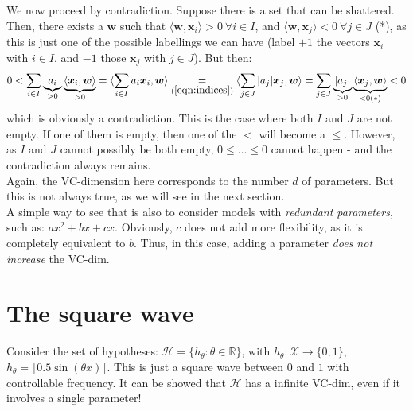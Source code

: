 \documentclass[../template.tex]{subfiles}
\begin{document}
We now proceed by contradiction. Suppose there is a set that can be shattered. Then, there exists a $\bm{w}$ such that $\langle \bm{w},  \bm{x}_i \rangle > 0 \> \forall i \in I$, and $\langle \bm{w}, \bm{x}_j \rangle < 0 \> \forall j \in J$ (*), as this is just one of the possible labellings we can have (label $+1$ the vectors $\bm{x}_i$ with $i \in I$, and $-1$ those $\bm{x}_j$  with $j \in J$). But then:
\begin{align*}
    0 < \sum_{i\in I} \underbrace{a_i}_{>0} \underbrace{\langle \bm{x}_i, \bm{w} \rangle}_{>0} = \langle \sum_{i\in I} a_i \bm{x}_i, \bm{w} \rangle \underset{(\ref{eqn:indices})}{=}   \langle \sum_{j\in J} |a_j| \bm{x}_j, \bm{w} \rangle = \sum_{j\in J} \underbrace{|a_j|}_{>0}  \underbrace{\langle \bm{x}_j, \bm{w} \rangle}_{<0 (*)}  < 0
\end{align*}    
which is obviously a contradiction. This is the case where both $I$ and $J$ are not empty. If one of them is empty, then one of the $<$ will become a $\leq$. However, as $I$ and $J$ cannot possibly be both empty, $0 \leq \dots \leq 0$ cannot happen - and the contradiction always remains.\\

Again, the VC-dimension here corresponds to the number $d$ of parameters. But this is not always true, as we will see in the next section.\\
A simple way to see that is also to consider models with \textit{redundant parameters}, such as: $ax^2 + bx + cx$. Obviously, $c$ does not add more flexibility, as it is completely equivalent to $b$. Thus, in this case, adding a parameter \textit{does not increase} the VC-dim.     

\section{The square wave}
Consider the set of hypotheses: $\mathcal{H}=\{h_\theta\colon \theta \in \mathbb{R}\}$, with $h_\theta\colon \mathcal{X} \to \{0,1\}$, $h_\theta = \lceil 0.5 \sin(\theta x)\rceil$. This is just a square wave between $0$ and $1$   with controllable frequency. It can be showed that $\mathcal{H}$ has a infinite VC-dim, even if it involves a single parameter! 
\end{document}
